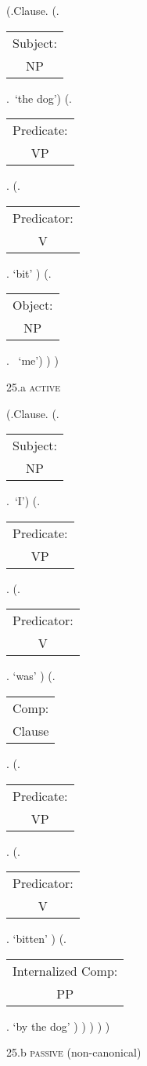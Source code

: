 \documentclass[12pt,letterpaper]{article}
\begin{document}
\begin{figure}
	\begin{center}
		\begin{parsetree}
			(.Clause.
			(.\begin{tabular}{c}Subject:\\NP\end{tabular}.~`the dog')
			(.\begin{tabular}{c}Predicate:\\VP\end{tabular}.
			(.\begin{tabular}{c}Predicator:\\V\end{tabular}. `bit' )
			(.\begin{tabular}{c}Object:\\NP\end{tabular}.~ 
			`me')
			)
			)
			
			\hfill \break\hfill \break
		\end{parsetree}
		25.a \textsc{active}
	\end{center}
\end{figure}

\begin{figure}
	\begin{center}
		\begin{parsetree}
			(.Clause.
			(.\begin{tabular}{c}Subject:\\NP\end{tabular}.~`I')
			(.\begin{tabular}{c}Predicate:\\VP\end{tabular}.
			(.\begin{tabular}{c}Predicator:\\V\end{tabular}. `was' )
			(.\begin{tabular}{c}Comp:\\Clause\end{tabular}.
			(.\begin{tabular}{c}Predicate:\\VP\end{tabular}.
			(.\begin{tabular}{c}Predicator:\\V\end{tabular}. `bitten' )
			(.\begin{tabular}{c}Internalized Comp:\\PP\end{tabular}. `by the dog' )
			)
			)
			)
			)
			
			\hfill \break\hfill \break
		\end{parsetree}
		25.b \textsc{passive} (non-canonical)
	\end{center}
\end{figure}
\end{document}
